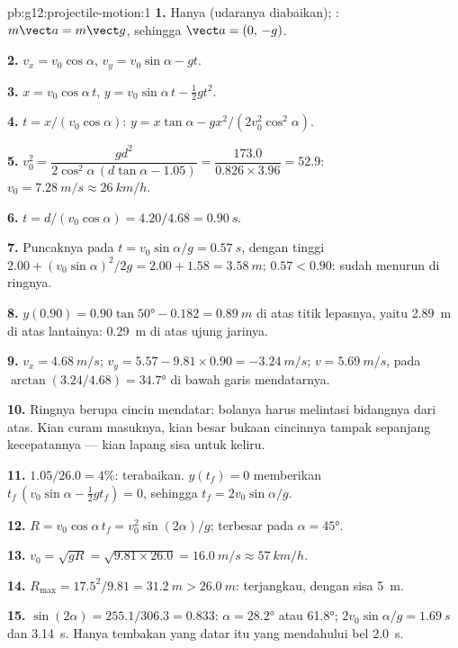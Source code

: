\begin{solution}{pb:g12:projectile-motion:1}
\textbf{1.} Hanya  (udaranya diabaikan); :
$m\vect a = m\vect g$, sehingga $\vect a = (0,\,-g)$.

\textbf{2.} $v_x = v_0\cos\alpha$, $v_y = v_0\sin\alpha - gt$.

\textbf{3.} $x = v_0\cos\alpha\, t$,
$y = v_0\sin\alpha\, t - \tfrac12 gt^2$.

\textbf{4.} $t = x/(v_0\cos\alpha)$:
$y = x\tan\alpha - g x^2/(2v_0^2\cos^2\alpha)$.

\textbf{5.} $v_0^2 = \dfrac{g d^2}{2\cos^2\alpha\,(d\tan\alpha -
1.05)} = \dfrac{173.0}{0.826 \times 3.96} = 52.9$:
$v_0 = \qty{7.28}{m/s} \approx \qty{26}{km/h}$.

\textbf{6.} $t = d/(v_0\cos\alpha) = 4.20/4.68 = \qty{0.90}{s}$.

\textbf{7.} Puncaknya pada $t = v_0\sin\alpha/g = \qty{0.57}{s}$, dengan tinggi
$2.00 + (v_0\sin\alpha)^2/2g = 2.00 + 1.58 = \qty{3.58}{m}$;
$0.57 < 0.90$: sudah menurun di ringnya.

\textbf{8.} $y(0.90) = 0.90\tan\ang{50} - 0.182 = \qty{0.89}{m}$
di atas titik lepasnya, yaitu \qty{2.89}{m} di atas lantainya: \qty{0.29}{m}
di atas ujung jarinya.

\textbf{9.} $v_x = \qty{4.68}{m/s}$;
$v_y = 5.57 - 9.81 \times 0.90 = \qty{-3.24}{m/s}$;
$v = \qty{5.69}{m/s}$, pada $\arctan(3.24/4.68) = \ang{34.7}$ di bawah
garis mendatarnya.

\textbf{10.} Ringnya berupa cincin mendatar: bolanya harus melintasi
bidangnya dari atas. Kian curam masuknya, kian besar bukaan cincinnya
tampak sepanjang kecepatannya --- kian lapang sisa untuk keliru.

\textbf{11.} $1.05/26.0 = 4\%$: terabaikan. $y(t_f) = 0$ memberikan
$t_f\,(v_0\sin\alpha - \tfrac12 g t_f) = 0$, sehingga
$t_f = 2v_0\sin\alpha/g$.

\textbf{12.} $R = v_0\cos\alpha\, t_f = v_0^2\sin(2\alpha)/g$;
terbesar pada $\alpha = \ang{45}$.

\textbf{13.} $v_0 = \sqrt{gR} = \sqrt{9.81 \times 26.0} =
\qty{16.0}{m/s} \approx \qty{57}{km/h}$.

\textbf{14.} $R_{\max} = 17.5^2/9.81 = \qty{31.2}{m} >
\qty{26.0}{m}$: terjangkau, dengan sisa  \qty{5}{m}.

\textbf{15.} $\sin(2\alpha) = 255.1/306.3 = 0.833$:
$\alpha = \ang{28.2}$ atau \ang{61.8}; 
$2v_0\sin\alpha/g = \qty{1.69}{s}$ dan \qty{3.14}{s}. Hanya tembakan yang
datar itu yang mendahului bel \qty{2.0}{s}.


\end{solution}
